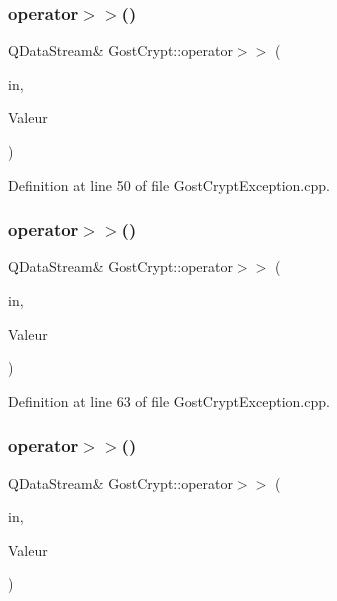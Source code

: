 \subsubsection{\texorpdfstring{operator$>$$>$()}{operator>>()}\hspace{0.1cm}{\footnotesize\ttfamily [2/13]}}
{\footnotesize\ttfamily Q\+Data\+Stream\& Gost\+Crypt\+::operator$>$$>$ (\begin{DoxyParamCaption}\item[{Q\+Data\+Stream \&}]{in,  }\item[{\hyperlink{class_gost_crypt_1_1_system_exception}{Gost\+Crypt\+::\+System\+Exception} \&}]{Valeur }\end{DoxyParamCaption})}



Definition at line 50 of file Gost\+Crypt\+Exception.\+cpp.

\mbox{\label{namespace_gost_crypt_a76f61997a08a429222c520f5eefd2623}} 
\subsubsection{\texorpdfstring{operator$>$$>$()}{operator>>()}\hspace{0.1cm}{\footnotesize\ttfamily [3/13]}}
{\footnotesize\ttfamily Q\+Data\+Stream\& Gost\+Crypt\+::operator$>$$>$ (\begin{DoxyParamCaption}\item[{Q\+Data\+Stream \&}]{in,  }\item[{\hyperlink{class_gost_crypt_1_1_failed_open_file}{Gost\+Crypt\+::\+Failed\+Open\+File} \&}]{Valeur }\end{DoxyParamCaption})}



Definition at line 63 of file Gost\+Crypt\+Exception.\+cpp.

\mbox{\label{namespace_gost_crypt_ac5980fee2234e40fa268491b18e9e155}} 
\subsubsection{\texorpdfstring{operator$>$$>$()}{operator>>()}\hspace{0.1cm}{\footnotesize\ttfamily [4/13]}}
{\footnotesize\ttfamily Q\+Data\+Stream\& Gost\+Crypt\+::operator$>$$>$ (\begin{DoxyParamCaption}\item[{Q\+Data\+Stream \&}]{in,  }\item[{\hyperlink{class_gost_crypt_1_1_failed_write_file}{Gost\+Crypt\+::\+Failed\+Write\+File} \&}]{Valeur }\end{DoxyParamCaption})}



